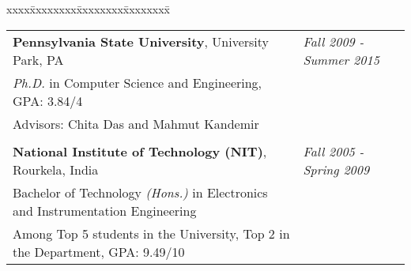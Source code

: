\documentclass[10pt,a4]{article}
\begin{document}
\begin{tabbing}
xxxx\=xxxxxxxx\=xxxxxxxx\=xxxxxxxx\=\kill

\>\begin{tabular*}{0.9\linewidth}{l@{\extracolsep{\fill}}l}
{\bf Pennsylvania State University}, University Park, PA & {\it Fall 2009 - Summer 2015} \\
{\it Ph.D.} in Computer Science and Engineering, GPA: 3.84/4 \\
Advisors: Chita Das and Mahmut Kandemir \\
& \\
{\bf National Institute of Technology (NIT)}, Rourkela, India & {\it Fall 2005 - Spring 2009} \\
Bachelor of Technology {\it (Hons.)} in Electronics and Instrumentation Engineering \\
Among Top 5 students in the University, Top 2 in the Department, GPA: 9.49/10 

\end{tabular*}
\end{tabbing}
\end{document}
